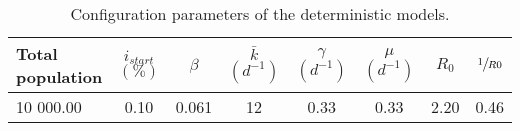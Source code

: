 \begin{table}[h]
\centering
\caption{Configuration parameters of the deterministic models.}
\label{tab:params}
\begin{tabular}{lccccccc}
\toprule
Total population & $i_{start}$ $(\%)$ & $\beta $  & $\bar{k} $ $(d^{-1})$ & $\gamma $ $(d^{-1})$ & $\mu$ $(d^{-1})$ & $R_0$ & $\sfrac{1}{R0}$\\
\midrule
10 000.00 & 0.10 &   0.061 &  12 &   0.33 &   0.33 &  2.20 &  0.46\\
\bottomrule
\end{tabular}
\end{table}
